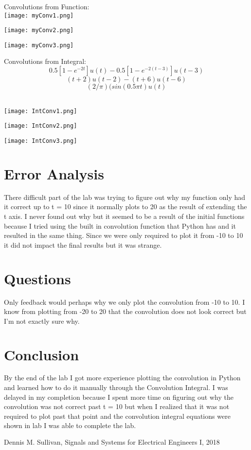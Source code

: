 \documentclass[12pt]{report}
\begin{document}
Convolutions from Function: 
\\ \texttt{[image: myConv1.png]}

\texttt{[image: myConv2.png]}

\texttt{[image: myConv3.png]}

Convolutions from Integral:
\begin{equation}
 0.5[1-e^{-2t}]u(t) - 0.5[1-e^{-2(t-3)}]u(t-3)
\end{equation}
\begin{equation}
(t+2)u(t-2) - (t+6)u(t-6) 
\end{equation}
\begin{equation}
(2/\pi)(sin(0.5\pi t)u(t) 
\end{equation}

\\ \texttt{[image: IntConv1.png]}

\texttt{[image: IntConv2.png]}

\texttt{[image: IntConv3.png]}



\section{Error Analysis}

There difficult part of the lab was trying to figure out why my function only had it correct up to t = 10 since it normally plots to 20 as the result of extending the t axis. I never found out why but it seemed to be a result of the initial functions because I tried using the built in convolution function that Python has and it resulted in the same thing. Since we were only required to plot it from -10 to 10 it did not impact the final results but it was strange. 

\section{Questions}
Only feedback would perhaps why we only plot the convolution from -10 to 10. I know from plotting from -20 to 20 that the convolution does not look correct but I'm not exactly sure why. 

\section{Conclusion}

By the end of the lab I got more experience plotting the convolution in Python and learned how to do it manually through the Convolution Integral. I was delayed in my completion because I spent more time on figuring out why the convolution was not correct past t = 10 but when I realized that it was not required to plot past that point and the convolution integral equations were shown in lab I was able to complete the lab.  

\newpage


\begin{thebibliography}{111}
Dennis M. Sullivan,
Signals and Systems for Electrical Engineers I,
 2018
\end{thebibliography}
\end{document}
